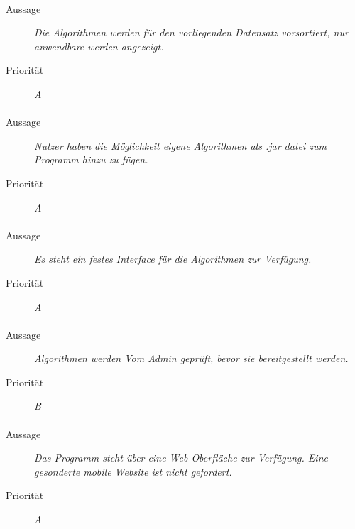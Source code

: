\paragraph{}
\begin{description}
\item[Aussage] \textit{Die Algorithmen werden für den vorliegenden Datensatz vorsortiert, nur anwendbare werden angezeigt.}
\item[Priorität] \textit{A}
\end{description}

\paragraph{}
\begin{description}
\item[Aussage] \textit{Nutzer haben die Möglichkeit eigene Algorithmen als .jar datei zum Programm hinzu zu fügen.}
\item[Priorität] \textit{A}
\end{description}

\paragraph{}
\begin{description}
\item[Aussage] \textit{Es steht ein festes Interface für die Algorithmen zur Verfügung.}
\item[Priorität] \textit{A}
\end{description}

\paragraph{}
\begin{description}
\item[Aussage] \textit{Algorithmen werden Vom Admin geprüft, bevor sie bereitgestellt werden.}
\item[Priorität] \textit{B}
\end{description}

\paragraph{}
\begin{description}
\item[Aussage] \textit{Das Programm steht über eine Web-Oberfläche zur Verfügung. Eine gesonderte mobile Website ist nicht gefordert.}
\item[Priorität] \textit{A}
\end{description}

